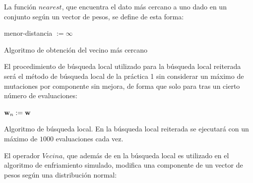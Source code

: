 \documentclass{article}
\newenvironment{algo}{
	\vspace*{0.5cm}
	\begin{algorithm}[H]}{
	\end{algorithm}
	\vspace*{0.5cm}
}
\begin{document}
\newpage

La función $nearest$, que encuentra el dato más cercano a uno dado en un conjunto según un vector de pesos, se define de esta forma:

\begin{algo}
	\label{nn}
	\BlankLine\BlankLine

	menor-distancia $:= \infty$\;
	\vspace{0.2cm}
	\caption{Algoritmo de obtención del vecino más cercano}
\end{algo}

El procedimiento de búsqueda local utilizado para la búsqueda local reiterada será el método de búsqueda local de la práctica 1 sin considerar un máximo de mutaciones por componente sin mejora, de forma que solo para tras un cierto número de evaluaciones:

\begin{algo}
	\label{bl}
	\BlankLine\BlankLine

	$\normalfont \textbf w_n := \normalfont \textbf w$\;

	\vspace{0.2cm}
	\caption{Algoritmo de búsqueda local. En la búsqueda local reiterada se ejecutará con un máximo de $1000$ evaluaciones cada vez.}
\end{algo}

\newpage
El operador $Vecina$, que además de en la búsqueda local es utilizado en el algoritmo de enfriamiento simulado, modifica una componente de un vector de pesos según una distribución normal:
\end{document}
